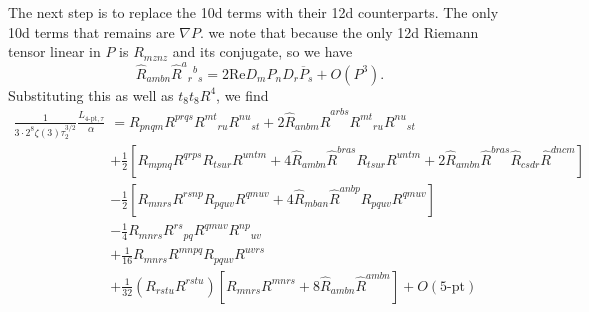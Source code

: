 The next step is to replace the 10d terms with their 12d counterparts. The only 10d terms that remains are $\nabla P$.
we note that because the only 12d Riemann tensor linear in $P$ is $R_{mznz}$ and its conjugate, so we have
\begin{equation}
\widehat{R}_{ambn} \widehat{R}^{a}{}_{r}{}^{b}{}_{s} = 2 \text{Re} D_m P_n D_r \overline{P}_s + O(P^3).
\end{equation}
Substituting this as well as $t_8 t_8 R^4$, we find
\begin{equation}
\begin{aligned}
\frac{1}{3 \cdot 2^{8}\zeta(3) \tau_2^{3/2}}\frac{L_{\text{4-pt},\tau}}{\alpha}
&=
R_{pnqm} R^{prqs} R^{mt}{}_{ru} R^{nu}{}_{st}
+ 2 \widehat{R}_{anbm} \widehat{R}^{arbs} R^{mt}{}_{ru} R^{nu}{}_{st}\\
& + \frac{1}{2}\left[ R_{mpnq} R^{qrps} R_{tsur} R^{untm}
+ 4 \widehat{R}_{ambn} \widehat{R}^{bras} R_{tsur} R^{untm}
+ 2 \widehat{R}_{ambn} \widehat{R}^{bras} \widehat{R}_{csdr} \widehat{R}^{dncm}\right]\\
& - \frac{1}{2}\left[ R_{mnrs} R^{rsnp} R_{pquv} R^{qmuv}
 + 4 \widehat{R}_{mban} \widehat{R}^{anbp} R_{pquv} R^{qmuv} \right]\\
& - \frac{1}{4} R_{mnrs} R^{rs}{}_{pq} R^{qmuv} R^{np}{}_{uv}\\
& + \frac{1}{16} R_{mnrs} R^{mnpq} R_{pquv} R^{uvrs}\\
& + \frac{1}{32}(R_{rstu} R^{rstu})
\left[R_{mnrs} R^{mnrs}+ 8 \widehat{R}_{ambn} \widehat{R}^{ambn}\right]+ O(\text{5-pt})
\end{aligned}
\label{eq:4pt-gravity-axiodilaton-12d-replaced}
\end{equation}

